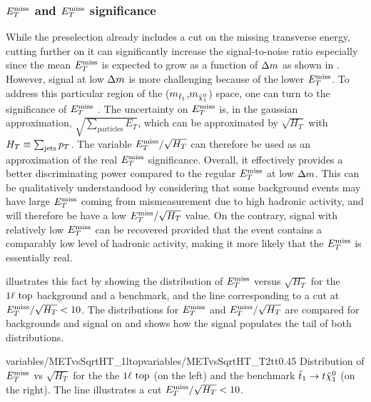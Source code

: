            \subsubsection{$E_T^\text{miss}$ and $E_T^\text{miss}$ significance}

        While the preselection already includes a cut on the missing transverse energy,
        cutting further on it can significantly increase the signal-to-noise ratio especially
        since the mean $E_T^\text{miss}$ is expected to grow as a function of $\Delta m$ as shown
        in . However, signal
        at low $\Delta m$ is more challenging because of the lower $E_T^\text{miss}$. To address this
        particular region of the ($m_{\tilde{t}_1}$,$m_{\tilde{\chi}_1^0}$) space, one
        can turn to the significance of $E_T^\text{miss}$ \cite{METperf8TeV, METsignificanceMirman}. The
        uncertainty on $E_T^\text{miss}$ is, in the gaussian approximation, $\sqrt{\sum_\text{particles} E_T}$,
        which can be approximated by $\sqrt{H_T}$ with $H_T \equiv \sum_\text{jets} p_T$.
        The variable $E_T^\text{miss} / \sqrt{H_T}$ can therefore be used as an approximation of the
        real $E_T^\text{miss}$ significance. Overall, it effectively provides a better discriminating
        power compared to the regular $E_T^\text{miss}$ at low $\Delta m$. This can be qualitatively understandood
        by considering that some background events may have large $E_T^\text{miss}$ coming
        from mismeasurement due to high hadronic activity, and will therefore be have
        a low $E_T^\text{miss}/\sqrt{H_T}$ value. On the contrary, signal with relatively low $E_T^\text{miss}$
        can be recovered provided that the event contains a comparably low level of hadronic
        activity, making it more likely that the $E_T^\text{miss}$ is essentially real.

         illustrates this fact by showing the distribution of
        $E_T^\text{miss}$ versus $\sqrt{H_T}$ for the $1\ell~\text{top}$ background and a benchmark, and
        the line corresponding to a cut at $E_T^\text{miss} / \sqrt{H_T} < 10$. The distributions
        for $E_T^\text{miss}$ and $E_T^\text{miss} / \sqrt{H_T}$ are compared for backgrounds and signal on
         and shows how the signal populates the
        tail of both distributions.

                         {variables/METvsSqrtHT_1ltop}{variables/METvsSqrtHT_T2tt}{0.45}
                         {Distribution of $E_T^\text{miss}$ vs $\sqrt{H_T}$ for the the
                         $1\ell~\text{top}$ (on the left) and the benchmark $\tilde{t}_1 \rightarrow
                         t \tilde{\chi}_1^0$ (on the right).
                         The line illustrates a cut $E_T^\text{miss} / \sqrt{H_T} < 10$.}

